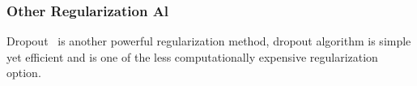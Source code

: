 \subsubsection{Other Regularization Al}

Dropout~\cite{JMLR:v15:srivastava14a} is another powerful regularization method, dropout algorithm is simple yet efficient and is one of the less computationally expensive regularization option. 